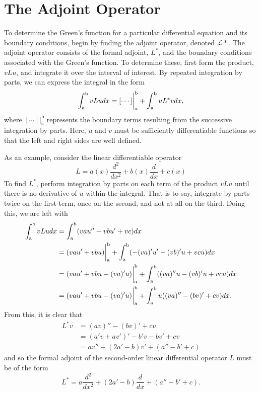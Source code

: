 \section{The Adjoint Operator}
To determine the Green's function for a particular differential equation and its boundary conditions, begin by finding the adjoint operator, denoted \(\mathcal{L*}\). The adjoint operator consists of the formal adjoint, \(L^*\), and the boundary conditions associated with the Green's function. To determine these, first form the product, \(vLu\), and integrate it over the interval of interest. By repeated integration by parts, we can express the integral in the form
\begin{equation}
	\int_\mathrm{a}^\mathrm{b} vLu dx = [\cdots]\biggr\rvert_\mathrm{a}^\mathrm{b} + \int_\mathrm{a}^\mathrm{b} uL^*v dx,
\end{equation}
where \([\cdots]\biggr\rvert_\mathrm{a}^\mathrm{b}\) represents the boundary terms resulting from the successive integration by parts. Here, \(u\) and \(v\) must be sufficiently differentiable functions so that the left and right sides are well defined. 

As an example, consider the linear differentiable operator
\begin{equation}
	L= a(x) \frac{d^2}{dx^2} + b(x)\frac{d}{dx} + c(x)
\end{equation}
To find \(L^*\), perform integration by parts on each term of the product \(vLu\) until there is no derivative of \(u\) within the integral. That is to say, integrate by parts twice on the first term, once on the second, and not at all on the third. Doing this, we are left with
\begin{equation}
	\begin{split}
		\int_\mathrm{a}^\mathrm{b} vLu dx &= \int_\mathrm{a}^\mathrm{b} (vau''+ vbu' + vc)dx\\
		&=(vau'+vbu)\biggr\rvert_\mathrm{a}^\mathrm{b} + \int_\mathrm{a}^\mathrm{b} (-(va)'u'-(vb)'u+vcu)dx\\
		&=(vau'+vbu-(va)'u)\biggr\rvert_\mathrm{a}^\mathrm{b} + \int_\mathrm{a}^\mathrm{b} ((va)''u-(vb)'u+vcu)dx\\
		&=(vau'+vbu-(va)'u)\biggr\rvert_\mathrm{a}^\mathrm{b} + \int_\mathrm{a}^\mathrm{b} u((va)''-(bv)'+cv)dx.
	\end{split}
\end{equation}
From this, it is clear that 
\begin{equation}
	\begin{split}
		L^*v &= (av)''-(bv)'+cv\\
		     &= (a'v+av')'-b'v-bv'+cv\\
		     &= av''+(2a'-b)v'+(a''-b'+c)
	\end{split}
\end{equation}
and so the formal adjoint of the second-order linear differential operator \(L\) must be of the form
\begin{equation}
	L^*=a\frac{d^2}{dx^2} + (2a'-b)\frac{d}{dx}+(a''-b'+c).
\end{equation}


